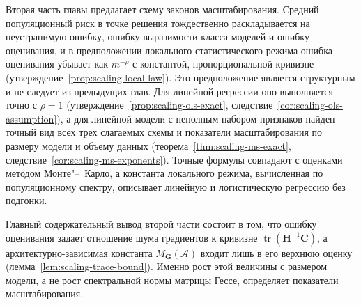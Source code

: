 Вторая часть главы предлагает схему законов масштабирования. Средний популяционный риск в точке решения тождественно раскладывается на неустранимую ошибку, ошибку выразимости класса моделей и ошибку оценивания, и в предположении локального статистического режима ошибка оценивания убывает как $m^{-\rho}$ с константой, пропорциональной кривизне (утверждение~\ref{prop:scaling-local-law}). Это предположение является структурным и не следует из предыдущих глав. Для линейной регрессии оно выполняется точно с $\rho=1$ (утверждение~\ref{prop:scaling-ols-exact}, следствие~\ref{cor:scaling-ols-assumption}), а для линейной модели с неполным набором признаков найден точный вид всех трех слагаемых схемы и показатели масштабирования по размеру модели и объему данных (теорема~\ref{thm:scaling-ms-exact}, следствие~\ref{cor:scaling-ms-exponents}). Точные формулы совпадают с оценками методом Монте"--~Карло, а константа локального режима, вычисленная по популяционному спектру, описывает линейную и логистическую регрессию без подгонки.

Главный содержательный вывод второй части состоит в том, что ошибку оценивания задает отношение шума градиентов к кривизне $\operatorname{tr}(\mathbf H^{-1}\mathbf C)$, а архитектурно-зависимая константа $M_{\mathbf G}(\mathcal A)$ входит лишь в его верхнюю оценку (лемма~\ref{lem:scaling-trace-bound}). Именно рост этой величины с размером модели, а не рост спектральной нормы матрицы Гессе, определяет показатели масштабирования.
